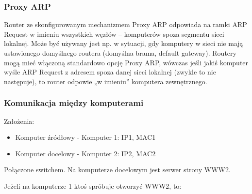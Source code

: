 \documentclass[../main.tex]{subfiles}
\begin{document}
    \subsubsection{Proxy ARP}
    Router ze skonfigurowanym mechanizmem Proxy ARP odpowiada na ramki ARP Request w
    imieniu wszystkich węzłów – komputerów spoza segmentu sieci lokalnej. Może
    być używany jest np. w sytuacji, gdy komputery w sieci nie mają ustawionego domyślnego
    routera (domyślna brama, default gateway). Routery mogą mieć włączoną standardowo
    opcję Proxy ARP, wówczas jeśli jakiś komputer wyśle ARP Request z adresem spoza danej
    sieci lokalnej (zwykle to nie następuje), to router odpowie „w imieniu” komputera
    zewnętrznego.


    \subsubsection{Komunikacja między komputerami}

    Założenia:
    \begin{itemize}
        \item Komputer źródłowy - Komputer 1: IP1, MAC1
        \item Komputer docelowy - Komputer 2: IP2, MAC2
    \end{itemize}
    Połączone switchem. Na komputerze docelowym jest serwer strony WWW2.

    Jeżeli na komputerze 1 ktoś spróbuje otworzyć WWW2, to:
\end{document}
